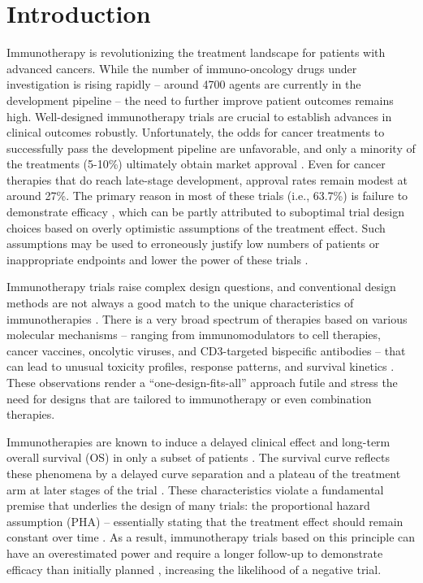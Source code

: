 \documentclass[a4paper,10pt]{article}
\begin{document}
\clearpage

\linenumbers

\section*{Introduction}
\label{introduction}

 Immunotherapy is revolutionizing the treatment landscape for patients with advanced
cancers. While the number of immuno-oncology drugs under investigation is rising rapidly -- around
4700 agents are currently in the development pipeline -- the need to further improve patient outcomes
remains high\cite{Upadhaya2020}. Well-designed immunotherapy trials are crucial to establish advances in clinical
outcomes robustly. Unfortunately, the odds for cancer treatments to successfully pass the
development pipeline are unfavorable, and only a minority of the treatments (5-10\%) ultimately
obtain market approval \cite{Dowden2019, Wong2018, BIO2021}. Even for cancer therapies that do 
reach late-stage development, approval rates remain modest at around 27\%\cite{Hwang2016}. 
The primary reason in most of these trials (i.e., 63.7\%) is failure 
to demonstrate efficacy \cite{Hwang2016}, 
which can be partly attributed to suboptimal trial design choices based on
overly optimistic assumptions of the treatment effect. Such assumptions may be used to erroneously
justify low numbers of patients or inappropriate endpoints and lower the power of 
these trials \cite{Hwang2016, deMiguel2020}. 

Immunotherapy trials raise complex design questions, and conventional design
methods are not always a good match to the unique characteristics of immunotherapies \cite{Li2020}.
There is a very broad spectrum of therapies based on various molecular mechanisms --
ranging from immunomodulators to cell therapies, cancer vaccines, 
oncolytic viruses, and CD3-targeted bispecific antibodies -- 
that can lead to unusual toxicity profiles, response patterns, and survival kinetics
\cite{Cousin2018, Seymour2017, Hoos2010}. 
These observations render a ``one-design-fits-all'' approach futile and stress the need 
for designs that are tailored to immunotherapy or even combination therapies.

Immunotherapies are known to induce a delayed clinical effect and long-term overall survival
 (OS) in only a subset of patients \cite{Chen2013}. The survival curve reflects these phenomena by a
 delayed curve separation and a plateau of the treatment arm at later stages of the trial \cite{Mick2015}. 
 These characteristics violate a fundamental premise that underlies the design of many
 trials: the proportional hazard assumption (PHA) -- essentially stating that the treatment
 effect should remain
 constant over time \cite{Rahman2019}. As a result, immunotherapy trials based on this principle can have an
 overestimated power \cite{Mick2015, Rahman2019} and require a longer follow-up to
demonstrate efficacy than initially planned \cite{Mick2015}, increasing the likelihood of a negative trial.
\end{document}
